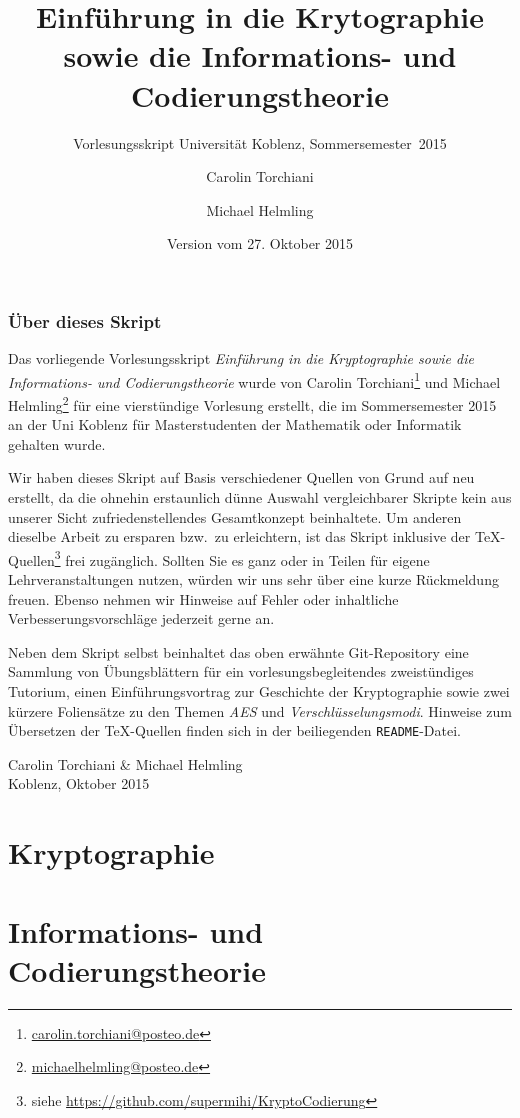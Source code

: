 \documentclass[
  paper=a4,
  fontsize=11pt,
  parskip=half,
  DIV=10,
  twoside=true
]{scrbook}
\title{Einführung in die Krytographie sowie die Informations- und Codierungstheorie}
\subtitle{Vorlesungsskript Universität Koblenz, Sommersemester~2015}
\author{Carolin Torchiani \and Michael Helmling}
\date{Version vom 27. Oktober 2015}
\theoremstyle{plain}
\theoremstyle{nonumberplain}
\begin{document}
\frontmatter

\maketitle
\section*{Über dieses Skript}
Das vorliegende Vorlesungsskript \emph{Einführung in die Kryptographie sowie die Informations- und Codierungstheorie} wurde von Carolin Torchiani\footnote{\href{mailto:carolin.torchiani@posteo.de}{carolin.torchiani@posteo.de}} und Michael Helmling\footnote{\href{mailto:michaelhelmling@posteo.de}{michaelhelmling@posteo.de}} für eine vierstündige Vorlesung erstellt, die im Sommersemester 2015 an der Uni Koblenz für Masterstudenten der Mathematik oder Informatik gehalten wurde.

Wir haben dieses Skript auf Basis verschiedener Quellen von Grund auf neu erstellt, da die ohnehin erstaunlich dünne Auswahl vergleichbarer Skripte kein aus unserer Sicht zufriedenstellendes Gesamtkonzept beinhaltete. Um anderen dieselbe Arbeit zu ersparen bzw.\ zu erleichtern, ist das Skript inklusive der \TeX-Quellen\footnote{siehe \url{https://github.com/supermihi/KryptoCodierung}} frei zugänglich. Sollten Sie es ganz oder in Teilen für eigene Lehrveranstaltungen nutzen, würden wir uns sehr über eine kurze Rückmeldung freuen. Ebenso nehmen wir Hinweise auf Fehler oder inhaltliche Verbesserungsvorschläge jederzeit gerne an.

Neben dem Skript selbst beinhaltet das oben erwähnte Git-Repository eine Sammlung von Übungsblättern für ein vorlesungsbegleitendes zweistündiges Tutorium, einen Einführungsvortrag zur Geschichte der Kryptographie sowie zwei kürzere Foliensätze zu den Themen \emph{AES} und \emph{Verschlüsselungsmodi}. Hinweise zum Übersetzen der \TeX-Quellen finden sich in der beiliegenden \texttt{README}-Datei.

\begin{FlushRight}
Carolin Torchiani \& Michael Helmling\\
Koblenz, Oktober 2015
\end{FlushRight}



\tableofcontents

\mainmatter

\part{Kryptographie}

\part{Informations- und Codierungstheorie}



\backmatter
\printbibliography[heading=bibintoc]

\cleardoublepage
\renewcommand\indexname{Stichwortverzeichnis}
\printindex
\end{document}
